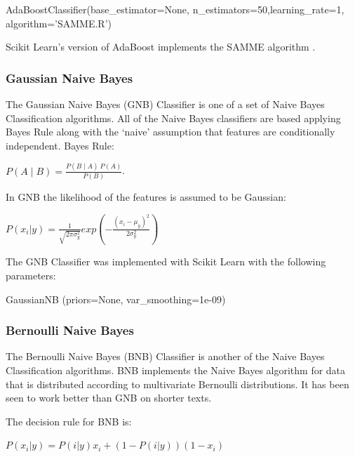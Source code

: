 \begin{tcolorbox}
\begin{center}
	AdaBoostClassifier(base\_estimator=None, n\_estimators=50,learning\_rate=1, algorithm=’SAMME.R’)
\end{center}
\end{tcolorbox}

Scikit Learn's version of AdaBoost implements the SAMME algorithm \cite{multiclassada2009}.

\subsubsection*{Gaussian Naive Bayes}

The Gaussian Naive Bayes (GNB) Classifier is one of a set of Naive Bayes Classification algorithms. All of the Naive Bayes classifiers are based applying Bayes Rule along with the ‘naive’ assumption that features are conditionally independent. Bayes Rule: 
\begin{center}
\(P(A\mid B)=\frac{P(B\mid A)\:P(A)}{P(B)}\). 
\end{center}
In GNB the likelihood of the features is assumed to be Gaussian:
\begin{center}
$P(x_i|y) = \frac{1}{\sqrt{2\pi\sigma_y^2}} exp (- \frac{(x_i - \mu_y)^2}{2\sigma_y^2})$
\end{center}
The GNB Classifier was implemented with Scikit Learn with the following parameters:

\begin{tcolorbox}
\begin{center}
	GaussianNB (priors=None, var\_smoothing=1e-09)
\end{center}
\end{tcolorbox}

\subsubsection*{Bernoulli Naive Bayes}

The Bernoulli Naive Bayes (BNB) Classifier is another of the Naive Bayes Classification algorithms. BNB implements the Naive Bayes algorithm for data that is distributed according to multivariate Bernoulli distributions. It has been seen to work better than GNB on shorter texts.

The decision rule for BNB is:
\begin{center}
$P(x_i|y) = P(i|y)x_i + (1 - P(i|y))(1 - x_i)$
\end{center}

